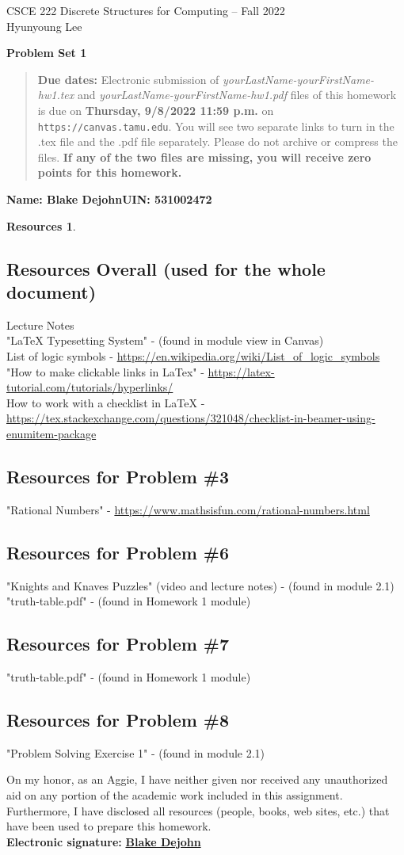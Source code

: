 \documentclass{article}
\theoremstyle{definition}
\newtheorem*{resources}{Resources}
\newcommand{\name}[2]{\noindent\textbf{Name: #1}\hfill \textbf{UIN: #2}
  \newcommand{\myName}{#1}
  \newcommand{\myUIN}{#2}
}
\newcommand{\honor}{\noindent On my honor, as an Aggie, I have neither
  given nor received any unauthorized aid on any portion of the
  academic work included in this assignment. Furthermore, I have
  disclosed all resources (people, books, web sites, etc.) that have
  been used to prepare this homework. \\[2ex]
 \textbf{Electronic signature:} \underline{ \textbf{Blake Dejohn} } } %
\newcommand{\problemset}[1]{\begin{center}\textbf{Problem Set #1}\end{center}}
\newcommand{\duedate}[1]{\begin{quote}\textbf{Due dates:} Electronic
    submission of \textsl{yourLastName-yourFirstName-hw1.tex} and 
    \textsl{yourLastName-yourFirstName-hw1.pdf} files of this homework is due on
    \textbf{#1} on \texttt{https://canvas.tamu.edu}. You will see two separate links
    to turn in the .tex file and the .pdf file separately. Please do not archive or compress the files.  
    \textbf{If any of the two files are missing, you will receive zero points for this homework.}\end{quote} }
\begin{document}
\begin{center}
{\large
CSCE 222 Discrete Structures for Computing -- Fall 2022\\[.5ex]
Hyunyoung Lee\\}
\end{center}
\problemset{1}
\duedate{Thursday, 9/8/2022 11:59 p.m.}
\name{Blake Dejohn}{531002472}  %
\begin{resources}
\hspace{1cm}
\subsection*{Resources Overall (used for the whole document)}
Lecture Notes\\
"LaTeX Typesetting System" - (found in module view in Canvas)\\
List of logic symbols - \url{https://en.wikipedia.org/wiki/List_of_logic_symbols}\\
"How to make clickable links in LaTex" - \url{https://latex-tutorial.com/tutorials/hyperlinks/}
\\
How to work with a checklist in LaTeX - \url{https://tex.stackexchange.com/questions/321048/checklist-in-beamer-using-enumitem-package}
\subsection*{Resources for Problem \#3}
"Rational Numbers" - \url{https://www.mathsisfun.com/rational-numbers.html}
\subsection*{Resources for Problem \#6}
"Knights and Knaves Puzzles" (video and lecture notes) - (found in module 2.1)\\
"truth-table.pdf" - (found in Homework 1 module)
\subsection*{Resources for Problem \#7}
"truth-table.pdf" - (found in Homework 1 module)
\subsection*{Resources for Problem \#8}
"Problem Solving Exercise 1" - (found in module 2.1)
\end{resources}
\honor
\end{document}
